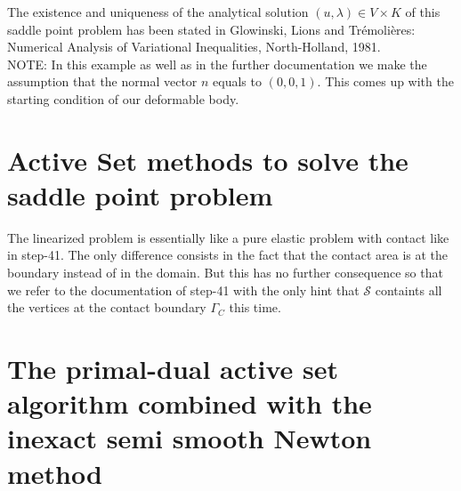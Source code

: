 \documentclass{article}
\begin{document}
\noindent
The existence and uniqueness of the analytical solution $(u,\lambda)\in V\times
K$ of this saddle point problem has been stated in Glowinski, Lions and Tr\'{e}moli\`{e}res: Numerical
Analysis of Variational Inequalities, North-Holland, 1981.\\

\noindent
NOTE: In this example as well as in the further documentation we make the
assumption that the normal vector $n$ equals to $(0,0,1)$. This comes up with
the starting condition of our deformable body.

\section{Active Set methods to solve the saddle point problem}

The linearized problem is essentially like a pure elastic problem with contact like
in step-41. The only difference consists in the fact that the contact area
is at the boundary instead of in the domain. But this has no further consequence
so that we refer to the documentation of step-41 with the only hint that
$\mathcal{S}$ containts all the vertices at the contact boundary $\Gamma_C$ this
time.

\section{The primal-dual active set algorithm combined with the inexact semi smooth
Newton method}
\end{document}
